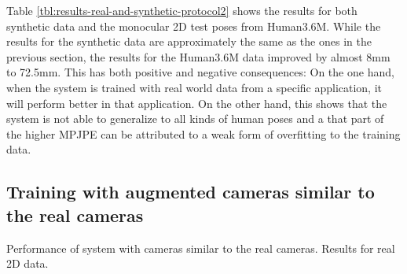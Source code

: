 

Table \ref{tbl:results-real-and-synthetic-protocol2} shows the results for both synthetic data and the monocular 2D test poses from Human3.6M.
While the results for the synthetic data are approximately the same as the ones in the previous section, the results for the Human3.6M data improved by almost 8mm to 72.5mm.
This has both positive and negative consequences:
On the one hand, when the system is trained with real world data from a specific application, it will perform better in that application.
On the other hand, this shows that the system is not able to generalize to all kinds of human poses and a that part of the higher MPJPE can be attributed to a weak form of overfitting to the training data. 

\subsection{Training with augmented cameras similar to the real cameras}
Performance of system with cameras similar to the real cameras.
Results for real 2D data.

